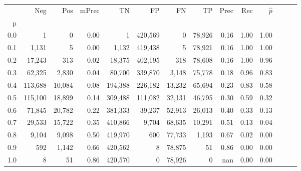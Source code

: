 \begin{tabular}{rrrrrrrrrrrrrr}
\toprule
{} &      Neg &     Pos & mPrec &       TN &       FP &      FN &      TP &  Prec &   Rec & $\hat{p}$ \\
p   &          &         &       &          &          &         &         &       &       &           \\
\midrule
0.0 &        1 &       0 &  0.00 &        1 &  420,569 &       0 &  78,926 &  0.16 &  1.00 &      1.00 \\
0.1 &    1,131 &       5 &  0.00 &    1,132 &  419,438 &       5 &  78,921 &  0.16 &  1.00 &      1.00 \\
0.2 &   17,243 &     313 &  0.02 &   18,375 &  402,195 &     318 &  78,608 &  0.16 &  1.00 &      0.96 \\
0.3 &   62,325 &   2,830 &  0.04 &   80,700 &  339,870 &   3,148 &  75,778 &  0.18 &  0.96 &      0.83 \\
0.4 &  113,688 &  10,084 &  0.08 &  194,388 &  226,182 &  13,232 &  65,694 &  0.23 &  0.83 &      0.58 \\
0.5 &  115,100 &  18,899 &  0.14 &  309,488 &  111,082 &  32,131 &  46,795 &  0.30 &  0.59 &      0.32 \\
0.6 &   71,845 &  20,782 &  0.22 &  381,333 &   39,237 &  52,913 &  26,013 &  0.40 &  0.33 &      0.13 \\
0.7 &   29,533 &  15,722 &  0.35 &  410,866 &    9,704 &  68,635 &  10,291 &  0.51 &  0.13 &      0.04 \\
0.8 &    9,104 &   9,098 &  0.50 &  419,970 &      600 &  77,733 &   1,193 &  0.67 &  0.02 &      0.00 \\
0.9 &      592 &   1,142 &  0.66 &  420,562 &        8 &  78,875 &      51 &  0.86 &  0.00 &      0.00 \\
1.0 &        8 &      51 &  0.86 &  420,570 &        0 &  78,926 &       0 &   nan &  0.00 &      0.00 \\
\bottomrule
\end{tabular}
